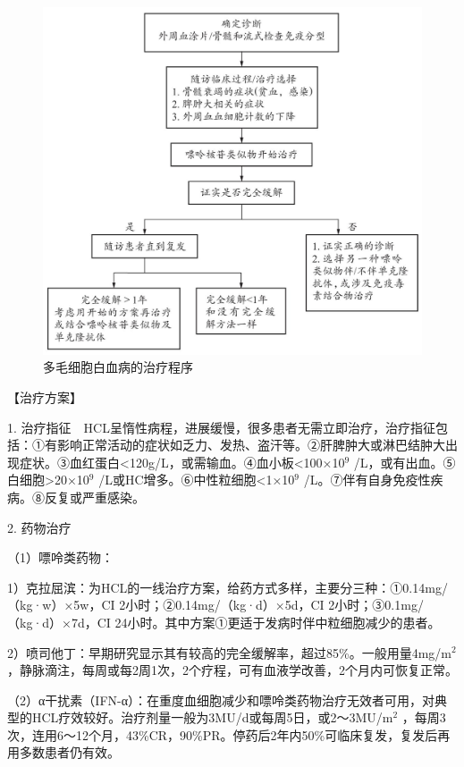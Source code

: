 \begin{figure}[!htbp]
 \centering
 \includegraphics{./images/Image00146.jpg}
 \captionsetup{justification=centering}
 \caption{多毛细胞白血病的治疗程序}
 \label{fig5-1-13}
  \end{figure} 

【治疗方案】

1.
治疗指征　HCL呈惰性病程，进展缓慢，很多患者无需立即治疗，治疗指征包括：①有影响正常活动的症状如乏力、发热、盗汗等。②肝脾肿大或淋巴结肿大出现症状。③血红蛋白<120g/L，或需输血。④血小板<100×10$^{9}$
/L，或有出血。⑤白细胞\textgreater{}20×10$^{9}$
/L或HC增多。⑥中性粒细胞<1×10$^{9}$
/L。⑦伴有自身免疫性疾病。⑧反复或严重感染。

2. 药物治疗

（1）嘌呤类药物：

1）克拉屈滨：为HCL的一线治疗方案，给药方式多样，主要分三种：①0.14mg/（kg·w）×5w，CI
2小时；②0.14mg/（kg·d）×5d，CI 2小时；③0.1mg/（kg·d）×7d，CI
24小时。其中方案①更适于发病时伴中粒细胞减少的患者。

2）喷司他丁：早期研究显示其有较高的完全缓解率，超过85\%。一般用量4mg/m$^2$
，静脉滴注，每周或每2周1次，2个疗程，可有血液学改善，2个月内可恢复正常。

（2）α干扰素（IFN-α）：在重度血细胞减少和嘌呤类药物治疗无效者可用，对典型的HCL疗效较好。治疗剂量一般为3MU/d或每周5日，或2～3MU/m$^2$
，每周3次，连用6～12个月，43\%CR，90\%PR。停药后2年内50\%可临床复发，复发后再用多数患者仍有效。

